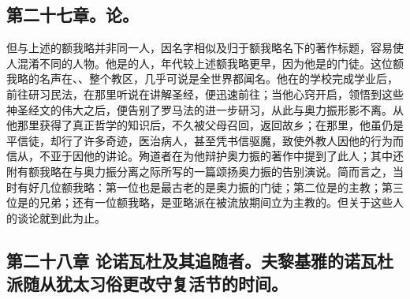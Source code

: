 
\subsection{第二十七章。论。}

但与上述的额我略并非同一人，因名字相似及归于额我略名下的著作标题，容易使人混淆不同的人物。他是的人，年代较上述额我略更早，因为他是的门徒。这位额我略的名声在、、整个教区，几乎可说是全世界都闻名。他在的学校完成学业后，前往研习民法，在那里听说在讲解圣经，便迅速前往；当他心窍开启，领悟到这些神圣经文的伟大之后，便告别了罗马法的进一步研习，从此与奥力振形影不离。从他那里获得了真正哲学的知识后，不久被父母召回，返回故乡；在那里，他虽仍是平信徒，却行了许多奇迹，医治病人，甚至凭书信驱魔，致使外教人因他的行为而信从，不亚于因他的讲论。殉道者在为他辩护奥力振的著作中提到了此人；其中还附有额我略在与奥力振分离之际所写的一篇颂扬奥力振的告别演说。简而言之，当时有好几位额我略：第一位也是最古老的是奥力振的门徒；第二位是的主教；第三位是的兄弟；还有一位额我略，是亚略派在被流放期间立为主教的。但关于这些人的谈论就到此为止。\par


\subsection{第二十八章 论诺瓦杜及其追随者。夫黎基雅的诺瓦杜派随从犹太习俗更改守复活节的时间。}

